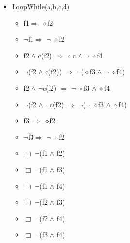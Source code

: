 \documentclass[a4paper, 11pt]{article}
\begin{document}
\begin{itemize}
\begin{itemize}
		\end{itemize}
		\item LoopWhile(a,b,c,d)
		\begin{itemize}
			\item f1$\Rightarrow$ $\diamond$f2
			\item $\neg$f1$\Rightarrow$ $\neg$ $\diamond$f2
			\item f2  $\wedge$  c(f2) $\Rightarrow$ $\diamond$c $\wedge$  $\neg$ $\diamond$f4
			\item $\neg$(f2  $\wedge$  c(f2)) $\Rightarrow$ $\neg$($\diamond$f3 $\wedge$  $\neg$ $\diamond$f4)
			\item f2  $\wedge$  $\neg$c(f2) $\Rightarrow$ $\neg$ $\diamond$f3  $\wedge$  $\diamond$f4
			\item $\neg$(f2  $\wedge$  $\neg$c(f2) $\Rightarrow$ $\neg$($\neg$ $\diamond$f3 $\wedge$  $\diamond$f4)
			\item f3 $\Rightarrow$ $\diamond$f2
			\item $\neg$f3$\Rightarrow$ $\neg$ $\diamond$f2
			\item $\Box$ $\neg$(f1  $\wedge$  f2)
			\item $\Box$ $\neg$(f1  $\wedge$  f3)
			\item $\Box$ $\neg$(f1  $\wedge$  f4)
			\item $\Box$ $\neg$(f2  $\wedge$  f3)
			\item $\Box$ $\neg$(f2  $\wedge$  f4)
			\item $\Box$ $\neg$(f3  $\wedge$  f4) 
		\end{itemize}
	\end{itemize}	
	
\end{document}

